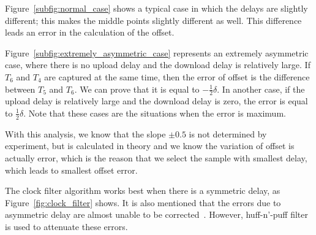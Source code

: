 

Figure~\ref{subfig:normal_case} shows a typical case in which the delays are
slightly different; this makes the middle points slightly different as well.
This difference leads an error in the calculation of the offset.

Figure~\ref{subfig:extremely_asymmetric_case} represents an extremely
asymmetric case, where there is no upload delay and the download delay is
relatively large. If $T_6$ and $T_4$ are captured at the same time, then the
error of offset is the difference between $T_5$ and $T_6$. We can prove that it
is equal to $-\frac{1}{2}\delta$. In another case, if the upload delay is
relatively large and the download delay is zero, the error is equal to
$\frac{1}{2}\delta$. Note that these cases are the situations when the error is
maximum.

With this analysis, we know that the slope $\pm0.5$ is not determined by
experiment, but is calculated in theory and we know the variation of offset is
actually error, which is the reason that we select the sample with smallest
delay, which leads to smallest offset error.

The clock filter algorithm works best when there is a symmetric delay, as
Figure~\ref{fig:clock_filter} shows. It is also mentioned that the errors due
to asymmetric delay are almost unable to be corrected~\cite{redbook}. However,
huff-n'-puff filter is used to attenuate these errors.

